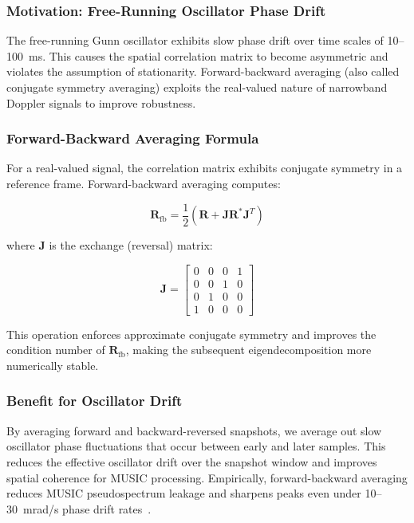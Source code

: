 \documentclass[10pt,a4paper]{article}
\begin{document}
\subsubsection{Motivation: Free-Running Oscillator Phase Drift}

The free-running Gunn oscillator exhibits slow phase drift over time scales of 10--100~ms. This causes the
spatial correlation matrix to become asymmetric and violates the assumption of stationarity. Forward-backward
averaging (also called conjugate symmetry averaging) exploits the real-valued nature of narrowband Doppler signals
to improve robustness.

\subsubsection{Forward-Backward Averaging Formula}

For a real-valued signal, the correlation matrix exhibits conjugate symmetry in a reference frame. Forward-backward
averaging computes:

\begin{equation}
\mathbf{R}_{\text{fb}} = \frac{1}{2} \left( \mathbf{R} + \mathbf{J} \mathbf{R}^* \mathbf{J}^T \right)
\label{eq:fb_averaging}
\end{equation}

where $\mathbf{J}$ is the exchange (reversal) matrix:

\begin{equation}
\mathbf{J} = \begin{bmatrix} 0 & 0 & 0 & 1 \\ 0 & 0 & 1 & 0 \\ 0 & 1 & 0 & 0 \\ 1 & 0 & 0 & 0 \end{bmatrix}
\label{eq:exchange_matrix}
\end{equation}

This operation enforces approximate conjugate symmetry and improves the condition number of $\mathbf{R}_{\text{fb}}$,
making the subsequent eigendecomposition more numerically stable.

\subsubsection{Benefit for Oscillator Drift}

By averaging forward and backward-reversed snapshots, we average out slow oscillator phase fluctuations that occur
between early and later samples. This reduces the effective oscillator drift over the snapshot window and improves
spatial coherence for MUSIC processing. Empirically, forward-backward averaging reduces MUSIC pseudospectrum
leakage and sharpens peaks even under 10--30~mrad/s phase drift rates~\cite{VanTrees2002}.
\end{document}
